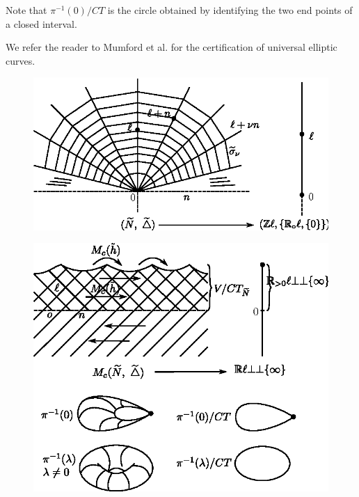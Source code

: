 Note that $\pi^{-1}(0)/CT$ is the circle obtained by identifying the
two end points of a closed interval. 

We refer the reader to Mumford et
al. \cite[Chap.~1. \S.~4]{keySC} for the  
certification of universal elliptic curves. 

\begin{figure}[H]
\centering 
\includegraphics{vol58-fig/fig58-60.eps} 
\end{figure}
\begin{figure}[H]
\centering 
\includegraphics{vol58-fig/fig58-61.eps} 
\end{figure}\pageoriginale

\medskip
{}

